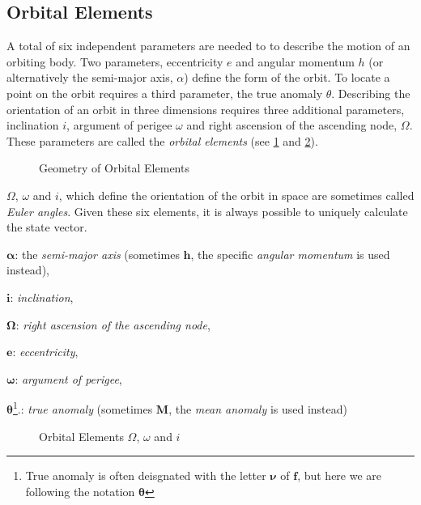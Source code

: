 \subsection{Orbital Elements}
\label{ssec:orbital-elements}

A total of six independent parameters are needed to to describe the motion of 
an orbiting body. Two parameters, eccentricity $e$ and angular momentum $h$ (or 
alternatively the semi-major axis, $\alpha$) define the form of the orbit. To 
locate a point on the orbit requires a third parameter, the true 
anomaly $\theta$. Describing the orientation of an orbit in three dimensions 
requires three additional parameters, inclination $i$, argument of perigee $\omega$ 
and right ascension of the ascending node, $\Omega$. These parameters are called 
the \emph{orbital elements} (see \ref{fig:orbital-elements-3d} and 
\ref{fig:orbital-elements-Ooi}).

\begin{figure}
  \centering
  
  \caption{Geometry of Orbital Elements}
  \label{fig:orbital-elements-3d}
\end{figure}

$\Omega$, $\omega$ and $i$, which define the orientation of the orbit in space 
are sometimes called \emph{Euler angles}. Given these six elements, it is always 
possible to uniquely calculate the state vector. 

\begin{description}
  \item $\bm{\alpha}$: the \emph{semi-major axis} (sometimes $\bm{h}$, the specific 
  \emph{angular momentum} is used instead),
  \item $\bm{i}$: \emph{inclination},
  \item $\bm{\Omega}$: \emph{right ascension of the ascending node},
  \item $\bm{e}$: \emph{eccentricity},
  \item $\bm{\omega}$: \emph{argument of perigee},
  \item $\bm{\theta}$\footnote{True anomaly is often deisgnated with the letter 
  $\bm{\nu}$ of $\bm{f}$, but here we are following the notation $\bm{\theta}$}.: 
  \emph{true anomaly} (sometimes $\bm{M}$, the \emph{mean anomaly} 
  is used instead)
\end{description}

\begin{figure}
  \centering
  
  \caption{Orbital Elements $\Omega$, $\omega$ and $i$}
  \label{fig:orbital-elements-Ooi}
\end{figure}

